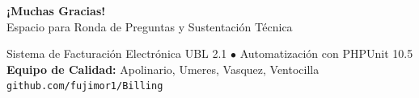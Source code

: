 \documentclass[aspectratio=169,10pt]{beamer}
\begin{document}
\begin{frame}[plain]
\vspace{1.2cm}
\begin{center}
    {\fontsize{18pt}{22pt}\selectfont\bfseries\color{accentblue}¡Muchas Gracias!}\\[0.3cm]
    {\fontsize{10pt}{12pt}\selectfont\color{textwhite}Espacio para Ronda de Preguntas y Sustentación Técnica}\\[0.5cm]
    \begin{tcolorbox}[colback=cardbg, colframe=cardbg, width=0.82\textwidth, arc=2.5mm, boxrule=0mm]
        \begin{center}
        \fontsize{7pt}{8.5pt}\selectfont\color{textgray}
        Sistema de Facturación Electrónica UBL 2.1 $\bullet$ Automatización con PHPUnit 10.5\\[0.06cm]
        \color{accentamber}\textbf{Equipo de Calidad:} Apolinario, Umeres, Vasquez, Ventocilla\\[0.06cm]
        \color{accentblue}\texttt{github.com/fujimor1/Billing}
        \end{center}
    \end{tcolorbox}
\end{center}
\end{frame}
\end{document}
